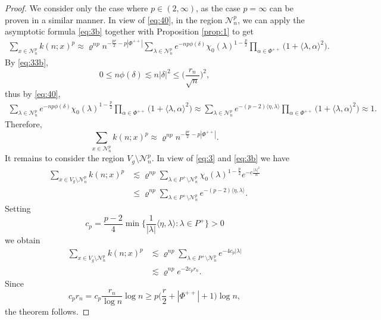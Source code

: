 \documentclass[11pt]{amsart}
\newcommand{\calN}{\mathcal{N}}
\newcommand{\scrN}{\mathscr{N}}
\newcommand{\sprod}[2]{\langle {#1}, {#2} \rangle}
\theoremstyle{plain}
\theoremstyle{definition}
\numberwithin{equation}{section}
\begin{document}
\begin{proof}
	We consider only the case where $p \in (2, \infty)$, as the case $p = \infty$ can be proven in a similar manner. 
	In view of \eqref{eq:40}, in the region $\scrN_n^p$, we can apply the asymptotic formula \eqref{eq:3b}
	together with Proposition \ref{prop:1} to get
	\begin{align*}
		\sum_{x \in \scrN_n^p} k(n; x)^p
		\approx
		\varrho^{np} n^{-\frac{pr}2 - p|\Phi^{++}|} 
		\sum_{\lambda \in \calN_n^p} e^{-n p \phi(\delta)} \chi_0(\lambda)^{1-\frac{p}2} 
		\prod_{\alpha \in \Phi^{++}} \big(1 + \sprod{\lambda}{\alpha}^2\big).
	\end{align*}
	By \eqref{eq:33b},
	\[
		0 \leqslant n \phi(\delta) \lesssim n |\delta|^2 \leqslant \Big(\frac{r_n}{\sqrt{n}}\Big)^2,
	\]
	thus by \eqref{eq:40},
	\begin{align*}
		\sum_{\lambda \in \calN_n^p} e^{-n p \phi(\delta)} \chi_0(\lambda)^{1-\frac{p}2} \prod_{\alpha \in \Phi^{++}}
		\big(1 + \sprod{\lambda}{\alpha}^2\big)
		\approx
		\sum_{\lambda \in \calN_n^p} e^{-(p-2)\sprod{\eta}{\lambda}} \prod_{\alpha \in \Phi^{++}}
		\big(1 + \sprod{\lambda}{\alpha}^2\big) \approx 1.
	\end{align*}
	Therefore,
	\[
		\sum_{x \in \scrN_n^p} k(n; x)^p \approx \varrho^{np} n^{-\frac{pr}2 - p|\Phi^{++}|}.
	\]
	It remains to consider the region $V_g \setminus \scrN_n^p$. In view of \eqref{eq:3} and \eqref{eq:3b} we have
	\begin{align*}
		\sum_{x \in V_g \setminus \scrN_n^p} k(n; x)^p 
		&\lesssim 
		\varrho^{np} 
		\sum_{\lambda \in P^+ \setminus \calN_n^p} 
		\chi_0(\lambda)^{1-\frac{p}2} e^{-c \frac{|\lambda|^2}{n}} \\
		&\leqslant
		\varrho^{np}
		\sum_{\lambda \in P^+ \setminus \calN_n^p}
		e^{-(p-2)\sprod{\eta}{\lambda}}.
	\end{align*}
	Setting
	\[
		c_p = \frac{p-2}{4} \min\bigg\{\frac{1}{|\lambda|} \sprod{\eta}{\lambda} : \lambda \in P^+ \bigg\} > 0
	\]
	we obtain
	\begin{align*}
		\sum_{x \in V_g \setminus \scrN_n^p} k(n; x)^p
		&\lesssim
		\varrho^{np} \sum_{\lambda \in P^+ \setminus \calN_n^p} e^{-4 c_p |\lambda|} \\
		&\lesssim
		\varrho^{np} e^{-2 c_p r_n}.
	\end{align*}
	Since
	\[
		c_p r_n  
		= c_p \frac{r_n}{\log n} \log n
		\geqslant p \bigg(\frac{r}{2} + |\Phi^{++}| + 1\bigg) \log n,
	\]
	the theorem follows.
\end{proof}
\end{document}
